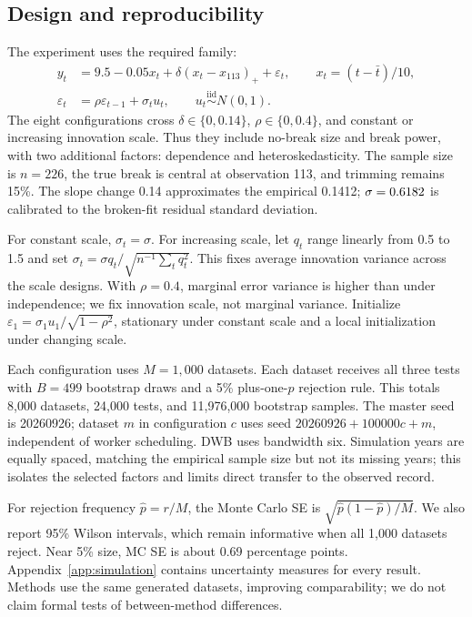 \documentclass[11pt,a4paper]{article}
\newcommand{\iid}{\mathrel{\mathop{\sim}\limits^{\mathrm{iid}}}}
\begin{document}
\subsection{Design and reproducibility}
The experiment uses the required family:
\begin{align}
 y_t&=9.5-0.05x_t+\delta(x_t-x_{113})_++\varepsilon_t,\qquad x_t=(t-\bar t)/10,\\
 \varepsilon_t&=\rho\varepsilon_{t-1}+\sigma_tu_t,\qquad u_t\iid N(0,1).
\end{align}
The eight configurations cross $\delta\in\{0,0.14\}$, $\rho\in\{0,0.4\}$, and constant or increasing innovation scale. Thus they include no-break size and break power, with two additional factors: dependence and heteroskedasticity. The sample size is $n=226$, the true break is central at observation 113, and trimming remains 15\%. The slope change 0.14 approximates the empirical 0.1412; $\sigma=0.6182$ is calibrated to the broken-fit residual standard deviation.

For constant scale, $\sigma_t=\sigma$. For increasing scale, let $q_t$ range linearly from 0.5 to 1.5 and set $\sigma_t=\sigma q_t/\sqrt{n^{-1}\sum_tq_t^2}$. This fixes average innovation variance across the scale designs. With $\rho=0.4$, marginal error variance is higher than under independence; we fix innovation scale, not marginal variance. Initialize $\varepsilon_1=\sigma_1u_1/\sqrt{1-\rho^2}$, stationary under constant scale and a local initialization under changing scale.

Each configuration uses $M=1,000$ datasets. Each dataset receives all three tests with $B=499$ bootstrap draws and a 5\% plus-one-$p$ rejection rule. This totals 8,000 datasets, 24,000 tests, and 11,976,000 bootstrap samples. The master seed is 20260926; dataset $m$ in configuration $c$ uses seed $20260926+100000c+m$, independent of worker scheduling. DWB uses bandwidth six. Simulation years are equally spaced, matching the empirical sample size but not its missing years; this isolates the selected factors and limits direct transfer to the observed record.

For rejection frequency $\widehat p=r/M$, the Monte Carlo SE is $\sqrt{\widehat p(1-\widehat p)/M}$. We also report 95\% Wilson intervals, which remain informative when all 1,000 datasets reject. Near 5\% size, MC SE is about 0.69 percentage points. Appendix~\ref{app:simulation} contains uncertainty measures for every result. Methods use the same generated datasets, improving comparability; we do not claim formal tests of between-method differences.
\end{document}
